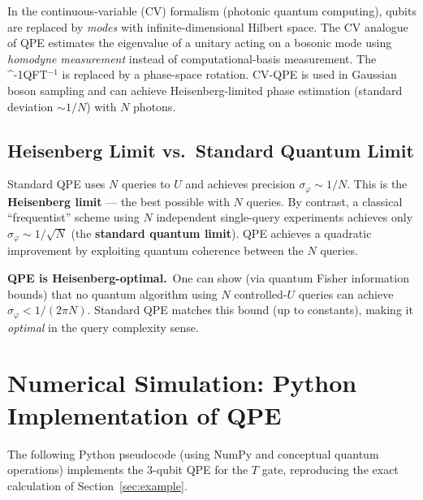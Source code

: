 \documentclass[12pt,a4paper]{article}
\newcommand{\QPE}{\textsc{QPE}}
\newcommand{\IQFT}{\ifmmode \text{\textsc{QFT}}^{-1}\else \textsc{QFT}$^{-1}$\fi}
\begin{document}
In the continuous-variable (CV) formalism (photonic quantum computing),
qubits are replaced by \emph{modes} with infinite-dimensional Hilbert space.
The CV analogue of QPE estimates the eigenvalue of a unitary acting on a
bosonic mode using \emph{homodyne measurement} instead of computational-basis
measurement.  The \IQFT{} is replaced by a phase-space rotation.  CV-QPE
is used in Gaussian boson sampling and can achieve Heisenberg-limited
phase estimation (standard deviation $\sim 1/N$) with $N$ photons.

\subsection{Heisenberg Limit vs.\ Standard Quantum Limit}

Standard QPE uses $N$ queries to $U$ and achieves precision $\sigma_\varphi \sim 1/N$.
This is the \textbf{Heisenberg limit} — the best possible with $N$ queries.
By contrast, a classical ``frequentist'' scheme using $N$ independent
single-query experiments achieves only $\sigma_\varphi \sim 1/\sqrt{N}$
(the \textbf{standard quantum limit}).  \QPE{} achieves a quadratic improvement
by exploiting quantum coherence between the $N$ queries.

\begin{tcolorbox}[insight]
  \textbf{QPE is Heisenberg-optimal.}\ One can show (via quantum Fisher
  information bounds) that no quantum algorithm using $N$ controlled-$U$
  queries can achieve $\sigma_\varphi < 1/(2\pi N)$.  Standard QPE matches
  this bound (up to constants), making it \emph{optimal} in the query complexity
  sense.
\end{tcolorbox}

\newpage

\section{Numerical Simulation: Python Implementation of QPE}
\label{app:code}

The following Python pseudocode (using NumPy and conceptual quantum operations)
implements the 3-qubit QPE for the $T$ gate, reproducing the exact calculation
of Section~\ref{sec:example}.
\end{document}

